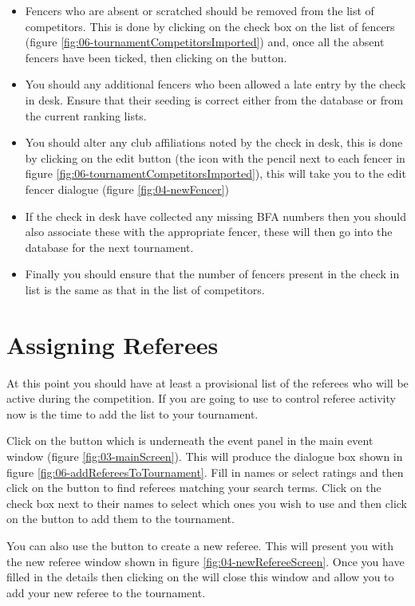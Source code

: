 \documentclass[a4paper,11pt]{memoir}
\begin{document}
\begin{itemize}
 \item  Fencers who are absent or scratched should be removed from the list of competitors. This is done by clicking on the check box on the list of fencers (figure \ref{fig:06-tournamentCompetitorsImported}) and, once all the absent fencers have been ticked, then clicking on the  button.
 \item You should any additional fencers who  been allowed a late entry by the check in desk. Ensure that their seeding is correct either from the database or from the current ranking lists.
 \item You should alter any club affiliations noted by the check in desk, this is done by clicking on the edit button (the icon with the pencil next to each fencer in figure \ref{fig:06-tournamentCompetitorsImported}), this will take you to the edit fencer dialogue (figure \ref{fig:04-newFencer})
 \item If the check in desk have collected any missing BFA numbers then you should also associate these with the appropriate fencer, these will then go into the database for the next tournament.
 \item Finally you should ensure that the number of fencers present in the check in list is the same as that in the list of competitors.
\end{itemize}

\section{Assigning Referees}
At this point you should have at least a provisional list of the referees who will be active during the competition. If you are going to use \fencingtime{} to control referee activity now is the time to add the list to your tournament.

Click on the  button which is underneath the event panel in the main event window (figure \ref{fig:03-mainScreen}). This will produce the dialogue box shown in figure \ref{fig:06-addRefereesToTournament}. Fill in names or select ratings and then click on the  button to find referees matching your search terms. Click on the check box next to their names to select which ones you wish to use and then click on the  button to add them to the tournament.

You can also use the  button to create a new referee. This will present you with the new referee window shown in figure \ref{fig:04-newRefereeScreen}. Once you have filled in the details then clicking on the  will close this window and allow you to add your new referee to the tournament.  
\end{document}
